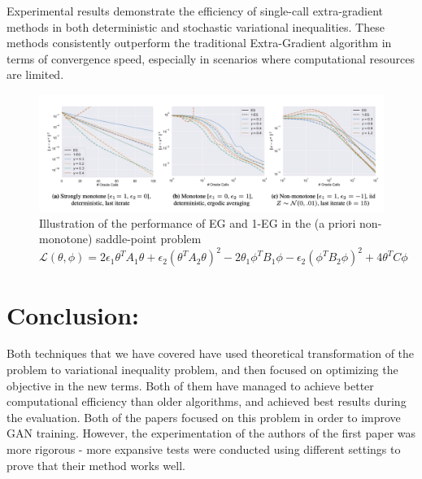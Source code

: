 \documentclass[11pt]{article}
\begin{document}
        Experimental results demonstrate the efficiency of single-call extra-gradient methods in both deterministic and stochastic variational inequalities. These methods consistently outperform the traditional Extra-Gradient algorithm in terms of convergence speed, especially in scenarios where computational resources are limited.
        \begin{figure}[h]
            \centering
            \includegraphics[scale=0.5]{pictures/pic1.png}
            \caption{Illustration of the performance of EG and 1-EG in the (a priori non-monotone) saddle-point problem $\mathcal{L}(\theta, \phi) = 2 \epsilon_1 \theta^T A_1 \theta + \epsilon_2 (\theta^T A_2 \theta)^2 - 2 \theta_1 \phi^T B_1 \phi - \epsilon_2 (\phi^T B_2 \phi)^2 + 4\theta^T C \phi$ }
            \label{fig:label}
        \end{figure}
 
	
\section{Conclusion:}
	Both techniques that we have covered have used theoretical transformation of the problem to variational inequality problem, and then focused on optimizing the objective in the new terms. Both of them have managed to achieve better computational efficiency than older algorithms, and achieved best results during the evaluation. Both of the papers focused on this problem in order to improve GAN training. However, the experimentation of the authors of the first paper was more rigorous - more expansive tests were conducted using different settings to prove that their method works well.
\end{document}
